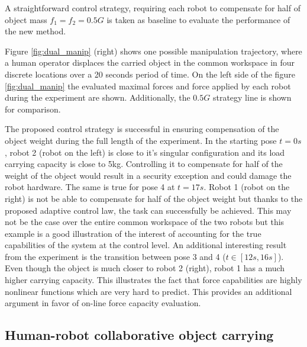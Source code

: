 A straightforward control strategy, requiring each robot to compensate for half of object mass $f_1=f_2=0.5G$ is taken as baseline to evaluate the performance of the new method.

Figure \ref{fig:dual_manip} (right) shows one possible manipulation trajectory, where a human operator displaces the carried object in the common workspace in four discrete locations over a 20 seconds period of time. On the left side of the figure \ref{fig:dual_manip} the evaluated maximal forces and force applied by each robot during the experiment are shown. Additionally, the $0.5G$ strategy line is shown for comparison. 

The proposed control strategy is successful in ensuring  compensation of the object weight during the full length of the experiment. In the starting pose $t=0s$, robot 2 (robot on the left) is close to it's singular configuration and its load carrying capacity is close to 5kg. Controlling it to compensate for half of the weight of the object would result in a security exception and could damage the robot hardware. The same is true for pose 4 at $t=17s$. Robot 1 (robot on the right) is not be able to compensate for half of the object weight but thanks to the proposed adaptive control law, the task can successfully be achieved. This may not be the case over the entire common workspace of the two robots but this example is a good illustration of the interest of accounting for the true capabilities of the system at the control level.  An additional interesting result from the experiment is the transition between pose 3 and 4 ($t \in [12s,16s]$). Even though the object is much closer to robot 2 (right), robot 1 has a much higher carrying capacity. This illustrates the fact that force capabilities are highly nonlinear functions which are very hard to predict. This provides an additional argument in favor of on-line force capacity evaluation. 


\subsection{Human-robot collaborative object carrying}
\label{ch:human_robot_carrying}


